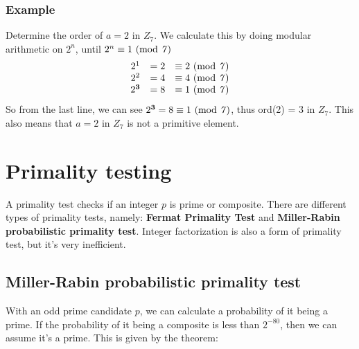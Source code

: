 \documentclass{article}
\begin{document}
	\subsubsection*{Example}
	Determine the order of $a = 2$ in $Z_7$. We calculate this by doing modular arithmetic on $2^n$, until $2^n \equiv 1 \text{ (mod \textit{7})}$
	\[
	\begin{matrix*}{}
		2^1&=2 &\equiv 2 \text{ (mod \textit{7})}\\
		2^2&=4 &\equiv 4 \text{ (mod \textit{7})}\\
		2^\textbf{3}&=8 &\equiv 1 \text{ (mod \textit{7})}\\
	\end{matrix*}
	\]
	So from the last line, we can see $2^\textbf{3}=8 \equiv 1 \text{ (mod \textit{7})}$, thus ord(2) = 3 in $Z_7$. This also means that $a = 2$ in $Z_7$ is not a primitive element.
	
	\section*{Primality testing}
	A primality test checks if an integer $p$ is prime or composite. There are different types of primality tests, namely: \textbf{Fermat Primality Test} and \textbf{Miller-Rabin probabilistic primality test}. Integer factorization is also a form of primality test, but it's very inefficient. \cite{primality}
	
	\subsection*{Miller-Rabin probabilistic primality test \cite{primality}}
	With an odd prime candidate $p$, we can calculate a probability of it being a prime. If the probability of it being a composite is less than $2^{-80}$, then we can assume it's a prime. This is given by the theorem:
	\\
	\\
	 

	\newpage
\end{document}
